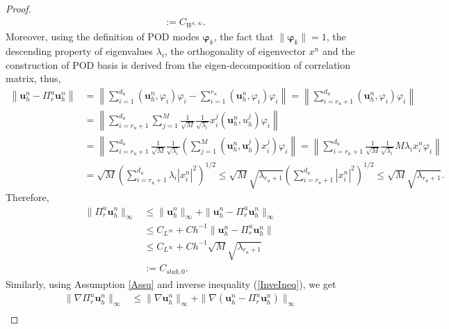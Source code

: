 \documentclass[10pt,twoside,openany,UTF8,CJK]{article}
\begin{document}
\begin{proof}
\begin{equation}
\begin{aligned}
			&:= C_{W^{1,\infty}}.
		\end{aligned}
		\end{equation}
		Moreover, using the definition of POD modes $\boldsymbol{\varphi}_k$, the fact that $\|\boldsymbol{\varphi}_k\|=1$, the descending property of eigenvalues $\lambda_i$, the orthogonality of eigenvector $x^n$ and the construction of POD basis is derived from the eigen-decomposition of correlation matrix, thus, 
		$$
		\begin{aligned}
			\left\| \boldsymbol{u}^n_h - \Pi^u_r\boldsymbol{u}^n_h \right\| &= \left\|\sum_{i=1}^{d_u}(\boldsymbol{u}^n_h, \varphi_i)\varphi_i - \sum_{i=1}^{r_u}(\boldsymbol{u}^n_h, \varphi_i)\varphi_i\right\| = \left\|\sum_{i=r_u+1}^{d_u}(\boldsymbol{u}^n_h, \varphi_i)\varphi_i \right\|  \\
			&= \left\|\sum_{i=r_u+1}^{d_u}\sum_{j=1}^{M}\frac{1}{\sqrt{M}}\frac{1}{\sqrt{\lambda_i}}x^j_i(\boldsymbol{u}^n_h, u^j_h)\varphi_i \right\|  \\
			&= \left\|\sum_{i=r_u+1}^{d_u}\frac{1}{\sqrt{M}}\frac{1}{\sqrt{\lambda_i}}\left(\sum_{j=1}^{M}(\boldsymbol{u}^n_h, \boldsymbol{u}^j_h)x^j_i\right)\varphi_i \right\|  = \left\|\sum_{i=r_u+1}^{d_u}\frac{1}{\sqrt{M}}\frac{1}{\sqrt{\lambda_i}}M\lambda_ix^n_i\varphi_i \right\|  \\
			&= \sqrt{M}\left( \sum_{i=r_u+1}^{d_u}\lambda_i|x^n_i|^2 \right)^{1/2} \leq \sqrt{M}\sqrt{\lambda_{r_u+1}}\left( \sum_{i=r_u+1}^{d_u}|x^n_i|^2 \right)^{1/2} \leq \sqrt{M}\sqrt{\lambda_{r_u+1}}.
		\end{aligned}
	    $$
		Therefore,	
		\begin{equation}\label{Cons-Stab-0}
		\begin{aligned}
			\|\Pi^u_r \boldsymbol{u}^n_h\|_{\infty} &\leq \|\boldsymbol{u}^n_h\|_{\infty} + \|\boldsymbol{u}^n_h - \Pi^u_r \boldsymbol{u}^n_h\|_{\infty} \\
			&\leq C_{L^{\infty}} + Ch^{-1}\|\boldsymbol{u}^n_h - \Pi^u_r \boldsymbol{u}^n_h\| \\
			&\leq C_{L^{\infty}} + Ch^{-1}\sqrt{M}\sqrt{\lambda_{r_u+1}} \\
			&:= C_{stab,0}.
	    \end{aligned}
        \end{equation}
		Similarly, using Assumption \ref{Assu} and inverse inequality (\ref{InveIneq}), we get
		\begin{equation}
		\begin{aligned}\label{Cons-Stab-1}
			\|\nabla\Pi^u_r \boldsymbol{u}^n_h\|_{\infty} &\leq \|\nabla \boldsymbol{u}^n_h\|_{\infty} + \|\nabla(\boldsymbol{u}^n_h - \Pi^u_r \boldsymbol{u}^n_h)\|_{\infty} \\

\end{aligned}
\end{equation}
\end{proof}
\end{document}

